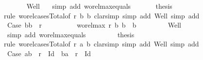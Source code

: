 \begin{isabellebody}
\ \ \ \ \ \isamarkupfalse%
\ Well\ {}\ \isamarkupfalse%
\ {\isacharparenleft}{\kern0pt}simp\ add{\isacharcolon}{\kern0pt}\ wo{\isacharunderscore}{\kern0pt}rel{\isachardot}{\kern0pt}max{}{\isacharunderscore}{\kern0pt}equals{}{\isacharparenright}{\kern0pt}\isanewline
\ \ \ \ \ \isamarkupfalse%
\ {\isacharquery}{\kern0pt}thesis\isanewline
\ \ \ \ \ \isamarkupfalse%
{\isacharparenleft}{\kern0pt}rule\ wo{\isacharunderscore}{\kern0pt}rel{\isachardot}{\kern0pt}cases{\isacharunderscore}{\kern0pt}Total{\isacharbrackleft}{\kern0pt}of\ r\ b{}\ b{}{\isacharbrackright}{\kern0pt}{\isacharcomma}{\kern0pt}\ clarsimp\ simp\ add{\isacharcolon}{\kern0pt}\ Well{\isacharcomma}{\kern0pt}\ simp\ add{\isacharcolon}{\kern0pt}\ {}{\isacharparenright}{\kern0pt}\isanewline
\ \ \ \ \ \ \ \isamarkupfalse%
\ Case{}{}{\isacharcolon}{\kern0pt}\ {\isachardoublequoteopen}{\isacharparenleft}{\kern0pt}b{}{\isacharcomma}{\kern0pt}b{}{\isacharparenright}{\kern0pt}\ {\isasymin}\ r{\isachardoublequoteclose}\isanewline
\ \ \ \ \ \ \ \isamarkupfalse%
\ {}{\isacharcolon}{\kern0pt}\ {\isachardoublequoteopen}wo{\isacharunderscore}{\kern0pt}rel{\isachardot}{\kern0pt}max{}\ r\ b{}\ b{}\ {\isacharequal}{\kern0pt}\ b{}{\isachardoublequoteclose}\isanewline
\ \ \ \ \ \ \ \isamarkupfalse%
\ Well\ {}\ \isamarkupfalse%
\ {\isacharparenleft}{\kern0pt}simp\ add{\isacharcolon}{\kern0pt}\ wo{\isacharunderscore}{\kern0pt}rel{\isachardot}{\kern0pt}max{}{\isacharunderscore}{\kern0pt}equals{}{\isacharparenright}{\kern0pt}\isanewline
\ \ \ \ \ \ \ \isamarkupfalse%
\ {\isacharquery}{\kern0pt}thesis\isanewline
\ \ \ \ \ \ \ \isamarkupfalse%
{\isacharparenleft}{\kern0pt}rule\ wo{\isacharunderscore}{\kern0pt}rel{\isachardot}{\kern0pt}cases{\isacharunderscore}{\kern0pt}Total{}{\isacharbrackleft}{\kern0pt}of\ r\ a{}\ b{}{\isacharbrackright}{\kern0pt}{\isacharcomma}{\kern0pt}\ clarsimp\ simp\ add{\isacharcolon}{\kern0pt}\ Well{\isacharcomma}{\kern0pt}\ simp\ add{\isacharcolon}{\kern0pt}\ {}{\isacharparenright}{\kern0pt}\isanewline
\ \ \ \ \ \ \ \ \ \isamarkupfalse%
\ Case{}{}{}{\isacharcolon}{\kern0pt}\ {\isachardoublequoteopen}{\isacharparenleft}{\kern0pt}a{}{\isacharcomma}{\kern0pt}b{}{\isacharparenright}{\kern0pt}\ {\isasymin}\ r\ {\isacharminus}{\kern0pt}\ Id\ {\isasymor}\ {\isacharparenleft}{\kern0pt}b{}{\isacharcomma}{\kern0pt}a{}{\isacharparenright}{\kern0pt}\ {\isasymin}\ r\ {\isacharminus}{\kern0pt}\ Id{\isachardoublequoteclose}\isanewline

\end{isabellebody}
